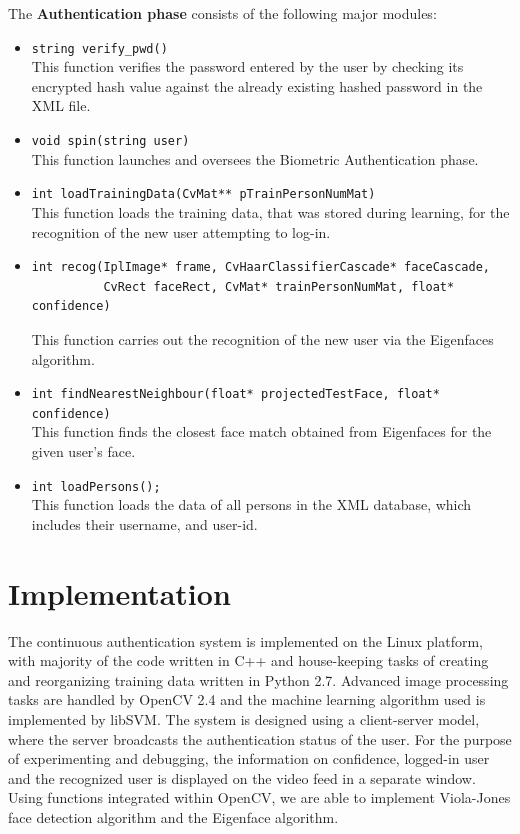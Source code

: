 \documentclass[12pt]{report}			%
\begin{document}
\noindent The \textbf{Authentication phase} consists of the following major modules:
\begin{itemize}

\item 
\verb+string verify_pwd()+\\
This function verifies the password entered by the user by checking its encrypted hash value against the already existing hashed password in the XML file.

\item 
\verb+void spin(string user)+\\
This function launches and oversees the Biometric Authentication phase.

\item 
\verb+int loadTrainingData(CvMat** pTrainPersonNumMat)+\\
This function loads the training data, that was stored during learning, for the recognition of the new user attempting to log-in.

\item 
\begin{verbatim}
int recog(IplImage* frame, CvHaarClassifierCascade* faceCascade,
          CvRect faceRect, CvMat* trainPersonNumMat, float* confidence)
\end{verbatim}
This function carries out the recognition of the new user via the Eigenfaces algorithm.

\item 
\verb+int findNearestNeighbour(float* projectedTestFace, float* confidence)+\\
This function finds the closest face match obtained from Eigenfaces for the given user's face.

\item 
\verb+int loadPersons();+\\
This function loads the data of all persons in the XML database, which includes their username, and user-id.

\end{itemize}


\newpage

\chapter{ Implementation }  
The continuous authentication system is implemented on the Linux platform, with majority of the code written in C++ and house-keeping tasks of creating and reorganizing training data written in Python 2.7.
Advanced image processing tasks are handled by OpenCV 2.4\cite{opencv} and the machine learning algorithm used is implemented by libSVM\cite{libsvm}.
The system is designed using a client-server model, where the server broadcasts the authentication status of the user.
For the purpose of experimenting and debugging, the information on confidence, logged-in user and the recognized user is displayed on the video feed in a separate window. Using functions integrated within OpenCV, we are able to implement Viola-Jones face detection algorithm and the Eigenface algorithm.
\end{document}
